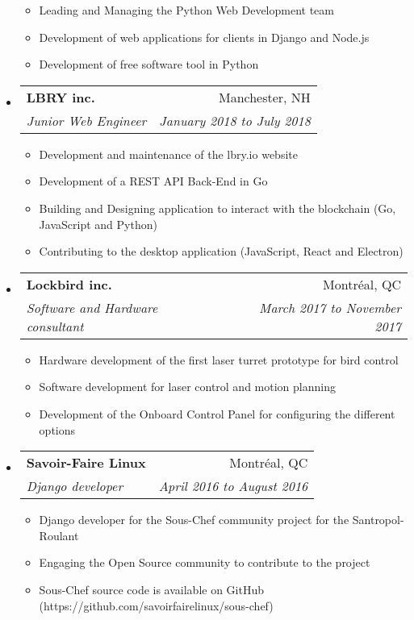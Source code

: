 \documentclass[letterpaper,11pt]{article}
\makeatletter
\newcommand{\ressubheading}[4]{
	\begin{tabular*}{6.5in}{l@{\cftdotfill{\cftsecdotsep}\extracolsep{\fill}}r}
		\textbf{#1} & #2 \\
		\textit{#3} & \textit{#4} \\
	\end{tabular*}\vspace{-6pt}}
\makeatother
\begin{document}
\begin{itemize}
		\begin{itemize}
			\item Leading and Managing the Python Web Development team
			\item Development of web applications for clients in Django and Node.js 
			\item Development of free software tool in Python
		\end{itemize}
		
		\item
		\ressubheading{LBRY inc.}{Manchester, NH}{Junior Web Engineer}{January 2018 to July 2018}
		
		\begin{itemize}
			\item Development and maintenance of the lbry.io website
			\item Development of a REST API Back-End in Go
			\item Building and Designing application to interact with the blockchain (Go, JavaScript and Python)
			\item Contributing to the desktop application (JavaScript, React and Electron)
		\end{itemize}
		
		\item
		\ressubheading{Lockbird inc.}{Montréal, QC}{Software and Hardware consultant}{March 2017 to November 2017}
		\begin{itemize}
			\item Hardware development of the first laser turret prototype for bird control
			\item Software development for laser control and motion planning
			\item Development of the Onboard Control Panel for  configuring the different options
		\end{itemize}
		
		\item
		\ressubheading{Savoir-Faire Linux}{Montréal, QC}{Django developer}{April 2016 to August 2016}
		
		\begin{itemize}
			\item Django developer for the Sous-Chef community project for the Santropol-Roulant
			\item Engaging the Open Source community to contribute to the project
			\item Sous-Chef source code is available on GitHub (https://github.com/savoirfairelinux/sous-chef)
		\end{itemize}
	\end{itemize}
	
\end{document}
